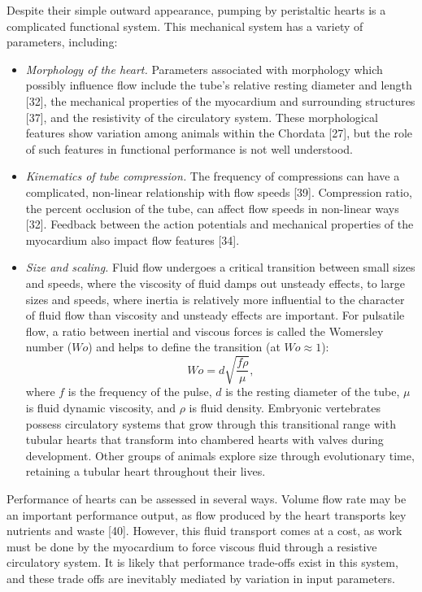 \documentclass[
]{article}
\providecommand{\tightlist}{%
  \setlength{\itemsep}{0pt}\setlength{\parskip}{0pt}}
\begin{document}
Despite their simple outward appearance, pumping by peristaltic hearts
is a complicated functional system. This mechanical system has a variety
of parameters, including:

\begin{itemize}
\tightlist
\item
  \emph{Morphology of the heart.} Parameters associated with morphology
  which possibly influence flow include the tube's relative resting
  diameter and length {[}32{]}, the mechanical properties of the
  myocardium and surrounding structures {[}37{]}, and the resistivity of
  the circulatory system. These morphological features show variation
  among animals within the Chordata {[}27{]}, but the role of such
  features in functional performance is not well understood.
\item
  \emph{Kinematics of tube compression.} The frequency of compressions
  can have a complicated, non-linear relationship with flow speeds
  {[}39{]}. Compression ratio, the percent occlusion of the tube, can
  affect flow speeds in non-linear ways {[}32{]}. Feedback between the
  action potentials and mechanical properties of the myocardium also
  impact flow features {[}34{]}.
\item
  \emph{Size and scaling.} Fluid flow undergoes a critical transition
  between small sizes and speeds, where the viscosity of fluid damps out
  unsteady effects, to large sizes and speeds, where inertia is
  relatively more influential to the character of fluid flow than
  viscosity and unsteady effects are important. For pulsatile flow, a
  ratio between inertial and viscous forces is called the Womersley
  number (\(Wo\)) and helps to define the transition (at
  \(Wo\approx1\)): \begin{equation}
  Wo = d\sqrt{\frac{f \rho}{\mu}},
  \label{Wo}
  \end{equation} where \(f\) is the frequency of the pulse, \(d\) is the
  resting diameter of the tube, \(\mu\) is fluid dynamic viscosity, and
  \(\rho\) is fluid density. Embryonic vertebrates possess circulatory
  systems that grow through this transitional range with tubular hearts
  that transform into chambered hearts with valves during development.
  Other groups of animals explore size through evolutionary time,
  retaining a tubular heart throughout their lives.
\end{itemize}

Performance of hearts can be assessed in several ways. Volume flow rate
may be an important performance output, as flow produced by the heart
transports key nutrients and waste {[}40{]}. However, this fluid
transport comes at a cost, as work must be done by the myocardium to
force viscous fluid through a resistive circulatory system. It is likely
that performance trade-offs exist in this system, and these trade offs
are inevitably mediated by variation in input parameters.
\end{document}
